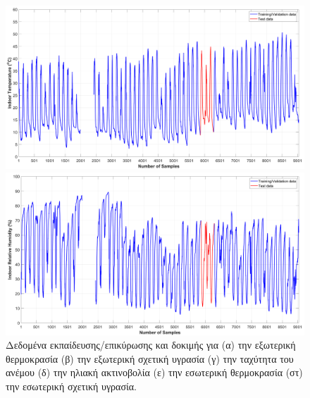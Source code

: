 \documentclass[12pt, a4paper]{report} %
\begin{document}
\begin{figure}[ht]
\begin{adjustwidth}{-1.2cm}{0cm}
        \begin{minipage}[c]{0.48\textwidth}
            \centering
            \includegraphics[scale=0.21]{Figures/NN_T_in.png}
            \caption*{\hspace{35pt}(ε)}{}
        \end{minipage}
        \hfill
        \begin{minipage}[c]{0.48\textwidth}
            \centering
            \includegraphics[scale=0.135]{Figures/NN_RH_in.png}
            \caption*{\hspace{35pt}(στ)}{}
        \end{minipage}
    \end{adjustwidth}
        
\caption{Δεδομένα εκπαίδευσης/επικύρωσης και δοκιμής για (α) την εξωτερική θερμοκρασία (β) την εξωτερική σχετική υγρασία 
(γ) την ταχύτητα του ανέμου (δ) την ηλιακή ακτινοβολία (ε) την εσωτερική θερμοκρασία (στ) την εσωτερική σχετική υγρασία.}
\label{fig_NN_data}
\end{figure}

\clearpage
\end{document}
